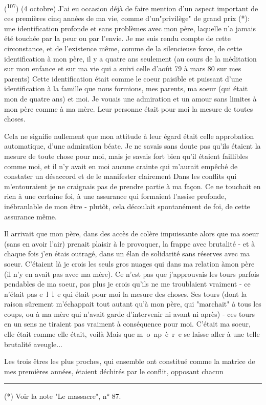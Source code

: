 

(\textsuperscript{107}) (4 octobre) J'ai eu occasion déjà de faire mention d'un aspect important de ces premières cinq années de ma vie, comme d'un"privilège" de grand prix (*): une identification profonde et sans problèmes avec mon père, laquelle n'a jamais été touchée par la peur ou par l'envie. Je me suis rendu compte de cette circonstance, et de l'existence même, comme de la silencieuse force, de cette identification à mon père, il y a quatre ans seulement (au cours de la méditation sur mon enfance et sur ma vie qui a suivi celle d'août 79 à mars 80 sur mes parents) Cette identification était comme le coeur paisible et puissant d'une identification à la famille que nous formions, mes parents, ma soeur (qui était mon  de quatre ans) et moi. Je vouais une admiration et un amour sans limites à mon père comme à ma mère. Leur personne était pour moi la mesure de toutes choses.

Cela ne signifie nullement que mon attitude à leur égard était celle  approbation automatique, d'une admiration béate. Je ne savais sans doute pas qu'ils étaient la mesure de toute chose pour moi, mais je savais fort bien qu'il étaient faillibles comme moi, et il n'y avait en moi aucune crainte qui m'aurait empêché de constater un désaccord et de le manifester clairement Dans les conflits qui m'entouraient\unsure{;|,} je ne craignais pas de prendre partie à ma façon. Ce ne touchait en rien à une certaine foi, à une assurance qui formaient l'assise profonde, inébranlable de mon être - plutôt, cela découlait spontanément de  foi, de cette assurance même.

Il arrivait que mon père, dans des accès de colère impuissante alors que ma soeur (sans en avoir l'air) prenait plaisir à le provoquer, la frappe avec brutalité - et à chaque fois j'en étais outragé, dans un élan de solidarité sans réserves avec ma soeur. C'étaient là je crois les seuls gros nuages qui  dans ma relation à\unsure{:}mon père (il n'y en avait pas avec ma mère). Ce n'est pas que j'approuvais les tours parfois pendables de ma soeur, pas plus je crois qu'ils ne me troublaient vraiment - ce n'était pas \mbox{e l l e} qui était pour moi la mesure des choses. Ses tours (dont la raison sûrement m'échappait tout autant qu'à mon père, qui "marchait" à tous les coups, ou à ma mère qui n'avait garde d'intervenir ni avant ni après) - ces tours en un sens ne tiraient pas vraiment à conséquence pour moi. C'était ma soeur, elle était comme elle était, voilà  Mais que \mbox{m o n}\quad\mbox{p è r e} se laisse aller à une telle brutalité aveugle...

Les trois êtres les plus proches, qui ensemble ont constitué comme la matrice de mes premières années, étaient déchirés par le conflit, opposant chacun

\noindent\rule{5em}{0.4pt}\par
(*) Voir la note "Le massacre", n° 87.

